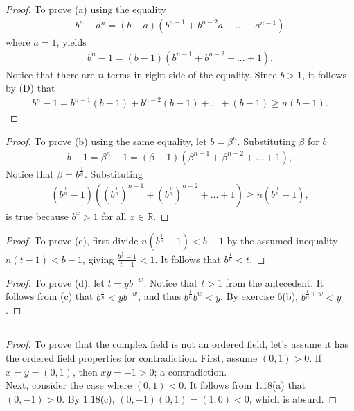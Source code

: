 \documentclass[12pt]{article}
\begin{document}
\subsection{}
\begin{proof}
				To prove (a) using the equality
				\begin{gather*}
								b^n-a^n=(b-a)(b^{n-1}+b^{n-2}a+...+a^{n-1})
				\end{gather*}
				where $a=1$, yields
				\begin{gather*}
								b^n-1=(b-1)(b^{n-1}+b^{n-2}+...+1).
				\end{gather*}
				Notice that there are $n$ terms in right side of the equality. Since $b>1$, 
				it follows by (D) that
				\begin{gather*}
								b^n-1=b^{n-1}(b-1)+b^{n-2}(b-1)+...+(b-1)\geq n(b-1).
				\end{gather*}
\end{proof}
\begin{proof}
				To prove (b) using the same equality, let $b=\beta^n$. 
				Substituting $\beta$ for $b$
				\begin{gather*}
								b-1=\beta^n-1=(\beta-1)(\beta^{n-1}+\beta^{n-2}+...+1),
				\end{gather*}
				Notice that $\beta = b^{\frac{1}{n}}$. Substituting
				\begin{gather*}
								(b^\frac{1}{n}-1)((b^\frac{1}{n})^{n-1}+(b^\frac{1}{n})^{n-2}+...+1)\geq
								n(b^\frac{1}{n}-1),
				\end{gather*}
				is true because $b^x>1$ for all $x\in\mathbb{R}$.
\end{proof}
\begin{proof}
				To prove (c), first divide $n(b^\frac{1}{n}-1)<b-1$ by the assumed inequality $n(t-1)<b-1$,
				giving $\frac{b^\frac{1}{n}-1}{t-1}<1$. It follows that $b^\frac{1}{n}<t$.
\end{proof}
\begin{proof}
				To prove (d), let $t=yb^{-w}$. Notice that $t>1$ from the antecedent. It follows from (c)
				that $b^\frac{1}{n}<yb^{-w}$, and thus $b^\frac{1}{n}b^w<y$. By exercise 6(b),
				$b^{\frac{1}{n}+w}<y$.
\end{proof}

\subsection{}
\begin{proof}
				To prove that the complex field is not an ordered field, let's assume it has the ordered
				field properties for contradiction. First, assume $(0,1)>0$. If $x=y=(0,1)$, then
				$xy=-1>0$; a contradiction.\\
				Next, consider the case where $(0,1)<0$. It follows from 1.18(a) that $(0,-1)>0$.
				By 1.18(c), $(0,-1)(0,1)=(1,0)<0$, which is absurd.
\end{proof}
\end{document}
